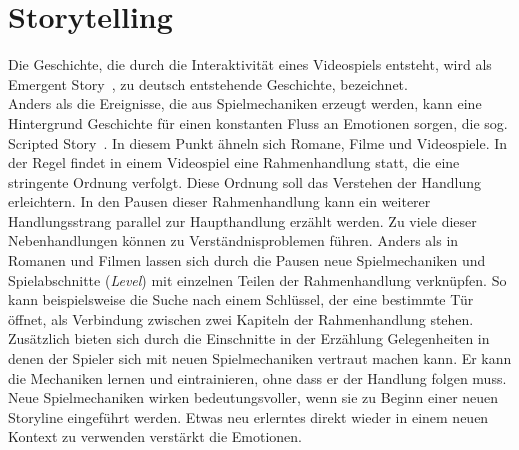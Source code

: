 \section{Storytelling} 

Die Geschichte, die durch die Interaktivität eines Videospiels entsteht, wird als \glqq Emergent Story\grqq\ , zu deutsch entstehende Geschichte, bezeichnet. \cite[S. 83 ff.]{Adams:1515529} \\ 
Anders als die Ereignisse, die aus Spielmechaniken erzeugt werden, kann eine Hintergrund Geschichte für einen konstanten Fluss an Emotionen sorgen, die sog. \glqq Scripted Story\grqq\ . In diesem Punkt ähneln sich Romane, Filme und Videospiele. In der Regel findet in einem Videospiel eine Rahmenhandlung statt, die eine stringente Ordnung verfolgt. Diese Ordnung soll das Verstehen der Handlung erleichtern. In den Pausen dieser Rahmenhandlung kann ein weiterer Handlungsstrang parallel zur Haupthandlung erzählt werden. 
Zu viele dieser Nebenhandlungen können zu Verständnisproblemen führen. Anders als in Romanen und Filmen lassen sich durch die Pausen neue Spielmechaniken und Spielabschnitte (\textit{Level}) mit einzelnen Teilen der Rahmenhandlung verknüpfen. So kann beispielsweise die Suche nach einem Schlüssel, der eine bestimmte Tür öffnet, als Verbindung zwischen zwei Kapiteln der Rahmenhandlung stehen. Zusätzlich bieten sich durch die Einschnitte in der Erzählung Gelegenheiten in denen der Spieler sich mit neuen Spielmechaniken vertraut machen kann. Er kann die Mechaniken lernen und eintrainieren, ohne dass er der Handlung folgen muss. Neue Spielmechaniken wirken bedeutungsvoller, wenn sie zu Beginn einer neuen Storyline eingeführt werden. Etwas neu erlerntes direkt wieder in einem neuen Kontext zu verwenden verstärkt die Emotionen.
\cite[S. 96]{Adams:1515529}\\
